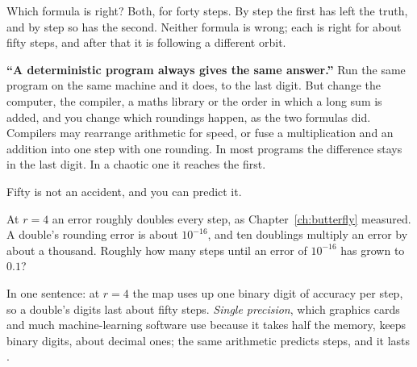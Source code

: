 
\noindent
Which formula is right? Both, for forty steps. By step 
the first has left the truth, and by step  so has the
second. Neither formula is wrong; each is right for about fifty steps, and
after that it is following a different orbit.

\begin{trapbox}
\textbf{\enquote{A deterministic program always gives the same answer.}}
Run the same program on the same machine and it does, to the last digit. But
change the computer, the compiler, a maths library or the order in which a
long sum is added, and you change which roundings happen, as the two formulas
did. Compilers may rearrange arithmetic for speed, or fuse a multiplication
and an addition into one step with one rounding. In most programs the
difference stays in the last digit. In a chaotic one it reaches the first.
\end{trapbox}

\noindent
Fifty is not an accident, and you can predict it.

\begin{think}
At $r = 4$ an error roughly doubles every step, as
Chapter~\ref{ch:butterfly} measured. A double's rounding error is about
$10^{-16}$, and ten doublings multiply an error by about a thousand. Roughly
how many steps until an error of $10^{-16}$ has grown to $\num{0.1}$?
\end{think}
In one sentence: at $r = 4$ the map uses up one binary digit of accuracy per
step, so a double's  digits last about fifty steps.
\emph{Single precision}, which graphics cards and much machine-learning
software use because it takes half the memory, keeps 
binary digits, about  decimal ones; the same arithmetic predicts  steps,
and it lasts .


